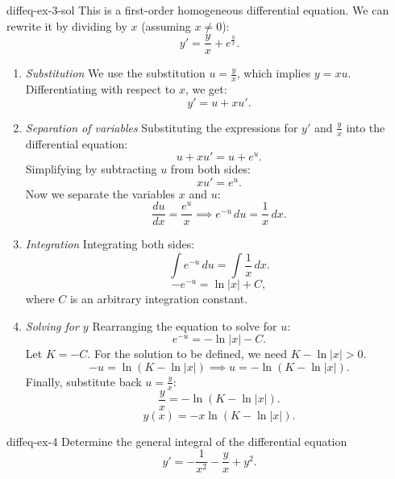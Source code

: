 \documentclass[preview]{standalone}
\begin{document}
\begin{snippetsolution}{diffeq-ex-3-sol}{}
    This is a first-order homogeneous differential equation. We can rewrite it by dividing by \(x\) (assuming \(x \neq 0\)):
    \[ y' = \frac{y}{x} + e^{\frac{y}{x}}. \]
    \begin{enumerate}
        \item \emph{Substitution}
        We use the substitution \( u = \frac{y}{x} \), which implies \( y = xu \).
        Differentiating with respect to \( x \), we get:
        \[ y' = u + xu'. \]
        \item \emph{Separation of variables}
        Substituting the expressions for \( y' \) and \( \frac{y}{x} \) into the differential equation:
        \[ u + xu' = u + e^u. \]
        Simplifying by subtracting \( u \) from both sides:
        \[ xu' = e^u. \]
        Now we separate the variables \( x \) and \( u \):
        \[ \frac{du}{dx} = \frac{e^u}{x} \implies e^{-u} \, du = \frac{1}{x} \, dx. \]
        \item \emph{Integration}
        Integrating both sides:
        \[ \int e^{-u} \, du = \int \frac{1}{x} \, dx. \]
        \[ -e^{-u} = \ln|x| + C, \]
        where \( C \) is an arbitrary integration constant.
        \item \emph{Solving for \(y\)}
        Rearranging the equation to solve for \( u \):
        \[ e^{-u} = -\ln|x| - C. \]
        Let \( K = -C \). For the solution to be defined, we need \( K - \ln|x| > 0 \).
        \[ -u = \ln(K - \ln|x|) \implies u = -\ln(K - \ln|x|). \]
        Finally, substitute back \( u = \frac{y}{x} \):
        \[ \frac{y}{x} = -\ln(K - \ln|x|). \]
        \[ y(x) = -x \ln(K - \ln|x|). \]
    \end{enumerate}
\end{snippetsolution}

\begin{snippetexercise}{diffeq-ex-4}{}
    Determine the general integral of the differential equation
    \[ y' = -\frac{1}{x^2} - \frac{y}{x} + y^2. \]
\end{snippetexercise}
\end{document}

